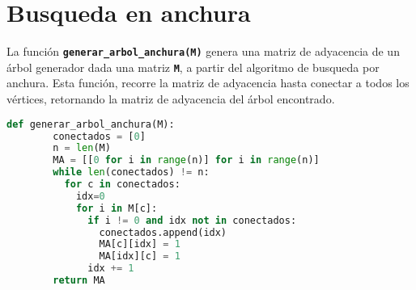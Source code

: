 \section{Busqueda en anchura}
La función \texttt{\textbf{generar\_arbol\_anchura(M)}} genera una matriz de adyacencia de un árbol generador dada una matriz \texttt{\textbf{M}}, a partir del algoritmo de busqueda por anchura.
Esta función, recorre la matriz de adyacencia hasta conectar a todos los vértices, retornando la matriz de adyacencia del árbol encontrado.
\begin{lstlisting}[language=python, caption=Función generar\_arbol\_anchura(M)]
    def generar_arbol_anchura(M):
        conectados = [0]
        n = len(M)
        MA = [[0 for i in range(n)] for i in range(n)]
        while len(conectados) != n:
          for c in conectados:
            idx=0
            for i in M[c]:
              if i != 0 and idx not in conectados:
                conectados.append(idx)
                MA[c][idx] = 1
                MA[idx][c] = 1
              idx += 1 
        return MA
\end{lstlisting}